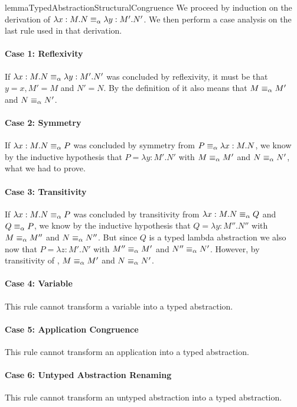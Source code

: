 \begin{longproof}{lemmaTypedAbstractionStructuralCongruence}
We proceed by induction on the derivation of $\lambda x:M.N \equiv_\alpha \lambda y:M'.N'$.
We then perform a case analysis on the last rule used in that derivation.

\paragraph{Case 1: Reflexivity}
If $\lambda x:M.N \equiv_\alpha \lambda y:M'.N' $ was concluded by reflexivity, it must be that $y=x, M'=M$ and $N'=N$. By the definition of \alphaequivalence it also means that $M \equiv_\alpha M'$ and $N \equiv_\alpha N'$.

\paragraph{Case 2: Symmetry}
If $\lambda x:M.N \equiv_\alpha P$ was concluded by symmetry from $P \equiv_\alpha \lambda x:M.N$, we know by the inductive hypothesis that $P=\lambda y:M'.N'$ with $M \equiv_\alpha M'$ and $N \equiv_\alpha N'$, what we had to prove.

\paragraph{Case 3: Transitivity}
If $\lambda x:M.N \equiv_\alpha P$ was concluded by transitivity from $\lambda x:M.N \equiv_\alpha Q$ and $Q \equiv_\alpha P$, we know by the inductive hypothesis that $Q=\lambda y:M''.N''$ with $M \equiv_\alpha M''$ and $N \equiv_\alpha N''$. But since $Q$ is a typed lambda abstraction we also now that $P=\lambda z:M'.N'$ with $M'' \equiv_\alpha M'$ and $N'' \equiv_\alpha N'$. However, by transitivity of \alphaequivalence, $M \equiv_\alpha M'$ and $N \equiv_\alpha N'$.

\paragraph{Case 4: Variable}
This rule cannot transform a variable into a typed abstraction.

\paragraph{Case 5: Application Congruence}
This rule cannot transform an application into a typed abstraction.

\paragraph{Case 6: Untyped Abstraction Renaming}
This rule cannot transform an untyped abstraction into a typed abstraction.


\end{longproof}
